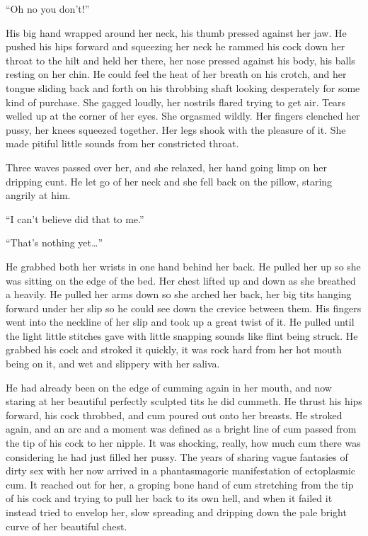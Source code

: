 \documentclass[letterpaper]{article}
\begin{document}
``Oh no you don't!'' 

His big hand wrapped around her neck, his thumb pressed against her jaw.
He pushed his hips forward and squeezing her neck he rammed his cock down her throat to the hilt and held her there, her nose pressed against his body, his balls resting on her chin.
He could feel the heat of her breath on his crotch, and her tongue sliding back and forth on his throbbing shaft looking desperately for some kind of purchase.
She gagged loudly, her nostrils flared trying to get air. Tears welled up at the corner of her eyes.
She orgasmed wildly. Her fingers clenched her pussy, her knees squeezed together. 
Her legs shook with the pleasure of it. She made pitiful little sounds from her constricted throat.

Three waves passed over her, and she relaxed, her hand going limp on her dripping cunt. He let go of her neck and she fell back on the pillow, staring angrily at him.

``I can't believe did that to me.''

``That's nothing yet\ldots''

He grabbed both her wrists in one hand behind her back.
He pulled her up so she was sitting on the edge of the bed. Her chest lifted up and down as she breathed a heavily.
He pulled her arms down so she arched her back, her big tits hanging forward under her slip so he could see down the crevice between them.
His fingers went into the neckline of her slip and took up a great twist of it. He pulled until the light little stitches gave with little snapping sounds like flint being struck.
He grabbed his cock and stroked it quickly, it was rock hard from her hot mouth being on it, and wet and slippery with her saliva.

He had already been on the edge of cumming again in her mouth, and now staring at her beautiful perfectly sculpted tits he did cummeth.
He thrust his hips forward, his cock throbbed, and cum poured out onto her breasts.
He stroked again, and an arc and a moment was defined as a bright line of cum passed from the tip of his cock to her nipple.
It was shocking, really, how much cum there was considering he had just filled her pussy.
The years of sharing vague fantasies of dirty sex with her now arrived in a phantasmagoric manifestation of ectoplasmic cum.
It reached out for her, a groping bone hand of cum stretching from the tip of his cock and trying to pull her back to its own hell, and when it failed it instead tried to envelop her, slow spreading and dripping down the pale bright curve of her beautiful chest.
\end{document}
